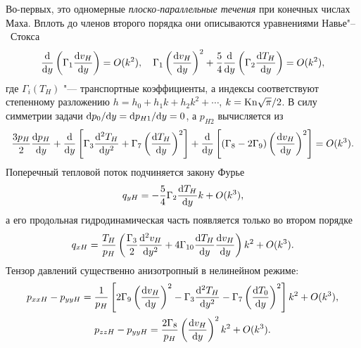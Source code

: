 Во-первых, это одномерные \emph{плоско-параллельные течения} при конечных числах Маха.
Вплоть до членов второго порядка они описываются уравнениями Навье"--~Стокса
\begin{equation*}
    \der{y}\left(\Gamma_1\der[v_H]{y}\right) = \OO{k^2}, \quad
    \Gamma_1\left(\der[v_H]{y}\right)^2
        + \frac54\der{y}\left(\Gamma_2\der[T_H]{y}\right) = \OO{k^2},
\end{equation*}
где \(\Gamma_i(T_H)\) "--- транспортные коэффициенты,
а индексы соответствуют степенному разложению \(h = h_0 + h_1k + h_2k^2 + \cdots\), \(k=\Kn\sqrt\pi/2\).
В силу симметрии задачи \(\Der[p_0]{y}=\Der[p_{H1}]{y}=0\), а \(p_{H2}\) вычисляется из
\begin{equation*}
    \frac{3p_H}{2}\der[p_H]{y}
        + \der{y}\left[ \Gamma_3 \derdual[T_H]{y} + \Gamma_7\left(\der[T_H]{y}\right)^2 \right]
        + \der{y}\left[ (\Gamma_8-2\Gamma_9)\left(\der[v_H]{y}\right)^2 \right] = \OO{k^3}.
\end{equation*}
Поперечный тепловой поток подчиняется закону Фурье
\begin{equation*}
    q_{yH} = -\frac54\Gamma_2\der[T_H]{y}k + \OO{k^3},
\end{equation*}
а его продольная гидродинамическая часть появляется только во втором порядке
\begin{equation*}
    q_{xH} = \frac{T_H}{p_H}\left( \frac{\Gamma_3}2 \derdual[v_H]{y}
        + 4\Gamma_{10} \der[T_H]{y}\der[v_H]{y} \right)k^2 + \OO{k^3}.
\end{equation*}
Тензор давлений существенно анизотропный в нелинейном режиме:
\begin{gather*}
    p_{xxH} - p_{yyH} = \frac1{p_H}\left[
        2\Gamma_9 \left(\der[v_H]{y}\right)^2 - \Gamma_3\derdual[T_H]{y} - \Gamma_7\left(\der[T_0]{y}\right)^2
    \right]k^2 + \OO{k^3}, \\
    p_{zzH} - p_{yyH} = \frac{2\Gamma_8}{p_H}\left(\der[v_H]{y}\right)^2 k^2 + \OO{k^3}.
\end{gather*}

